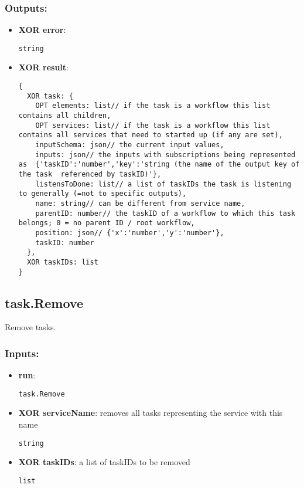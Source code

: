 \subsubsection*{Outputs:}
\begin{itemize}
  \small
    \item \textbf{XOR error}: 
\begin{lstlisting}
string
\end{lstlisting}
    \item \textbf{XOR result}: 
\begin{lstlisting}
{
  XOR task: {
    OPT elements: list// if the task is a workflow this list contains all children, 
    OPT services: list// if the task is a workflow this list contains all services that need to started up (if any are set), 
    inputSchema: json// the current input values, 
    inputs: json// the inputs with subscriptions being represented as  {'taskID':'number','key':'string (the name of the output key of the task  referenced by taskID)'}, 
    listensToDone: list// a list of taskIDs the task is listening to generally (=not to specific outputs), 
    name: string// can be different from service name, 
    parentID: number// the taskID of a workflow to which this task belongs; 0 = no parent ID / root workflow, 
    position: json// {'x':'number','y':'number'}, 
    taskID: number
  }, 
  XOR taskIDs: list
}
\end{lstlisting}
  \end{itemize}

\subsection{task.Remove}
\label{ch:builtinservices:task.Remove}
Remove tasks.
\subsubsection*{Inputs:}
\begin{itemize}
  \small
    \item \textbf{run}: 
\begin{lstlisting}
task.Remove
\end{lstlisting}
    \item \textbf{XOR serviceName}: removes all tasks representing the service with this name
\begin{lstlisting}
string
\end{lstlisting}
    \item \textbf{XOR taskIDs}: a list of taskIDs to be removed
\begin{lstlisting}
list
\end{lstlisting}
  \end{itemize}

